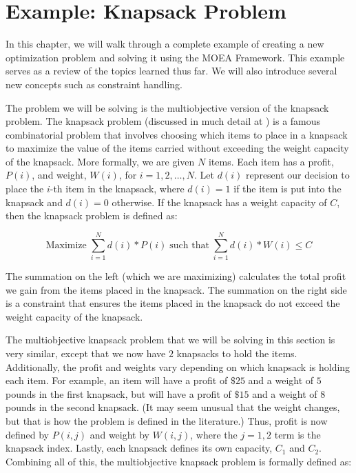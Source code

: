 %
%

\chapter{Example: Knapsack Problem}

In this chapter, we will walk through a complete example of creating a new optimization problem and solving it using the MOEA Framework.  This example serves as a review of the topics learned thus far.  We will also introduce several new concepts such as constraint handling.

The problem we will be solving is the multiobjective version of the knapsack problem.  The knapsack problem (discussed in much detail at ) is a famous combinatorial problem that involves choosing which items to place in a knapsack to maximize the value of the items carried without exceeding the weight capacity of the knapsack.  More formally, we are given $N$ items.  Each item has a profit, $P(i)$, and weight, $W(i)$, for $i = {1, 2, \ldots, N}$.  Let $d(i)$ represent our decision to place the $i$-th item in the knapsack, where $d(i)=1$ if the item is put into the knapsack and $d(i)=0$ otherwise.  If the knapsack has a weight capacity of $C$, then the knapsack problem is defined as:

\begin{equation*}
  \text{Maximize} \; \sum_{i=1}^{N} d(i)*P(i) \; \text{such that} \; \sum_{i=1}^{N} d(i)*W(i) \leq C
\end{equation*}

The summation on the left (which we are maximizing) calculates the total profit we gain from the items placed in the knapsack.  The summation on the right side is a constraint that ensures the items placed in the knapsack do not exceed the weight capacity of the knapsack.

The multiobjective knapsack problem that we will be solving in this section is very similar, except that we now have $2$ knapsacks to hold the items.  Additionally, the profit and weights vary depending on which knapsack is holding each item.  For example, an item will have a profit of $\$25$ and a weight of $5$ pounds in the first knapsack, but will have a profit of $\$15$ and a weight of $8$ pounds in the second knapsack.  (It may seem unusual that the weight changes, but that is how the problem is defined in the literature.)   Thus, profit is now defined by $P(i,j)$ and weight by $W(i,j)$, where the $j = {1, 2}$ term is the knapsack index.  Lastly, each knapsack defines its own capacity, $C_1$ and $C_2$.  Combining all of this, the multiobjective knapsack problem is formally defined as:

